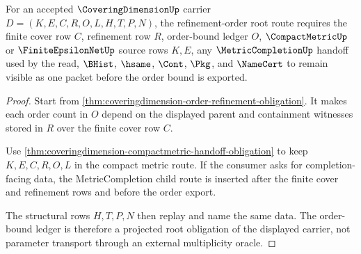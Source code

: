 \begin{theorem}
\label{thm:coveringdimension-refinement-order-root-route}
For an accepted $\CoveringDimensionUp$ carrier $D=(K,E,C,R,O,L,H,T,P,N)$, the refinement-order root route requires the finite cover row $C$, refinement row $R$, order-bound ledger $O$, $\CompactMetricUp$ or $\FiniteEpsilonNetUp$ source rows $K,E$, any $\MetricCompletionUp$ handoff used by the read, $\BHist$, $\hsame$, $\Cont$, $\Pkg$, and $\NameCert$ to remain visible as one packet before the order bound is exported.
\end{theorem}
\begin{proof}
Start from \autoref{thm:coveringdimension-order-refinement-obligation}. It makes each order count in $O$ depend on the displayed parent and containment witnesses stored in $R$ over the finite cover row $C$.

Use \autoref{thm:coveringdimension-compactmetric-handoff-obligation} to keep $K,E,C,R,O,L$ in the compact metric route. If the consumer asks for completion-facing data, the MetricCompletion child route is inserted after the finite cover and refinement rows and before the order export.

The structural rows $H,T,P,N$ then replay and name the same data. The order-bound ledger is therefore a projected root obligation of the displayed carrier, not parameter transport through an external multiplicity oracle.
\end{proof}

